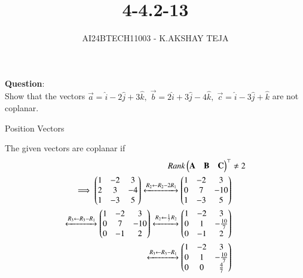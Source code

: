 \documentclass[journal]{IEEEtran}
\begin{document}

\vspace{3cm}

\title{4-4.2-13}
\author{AI24BTECH11003 - K.AKSHAY TEJA}
{\let\newpage\relax\maketitle}

\renewcommand{\thefigure}{\theenumi}
\renewcommand{\thetable}{\theenumi}
\setlength{\intextsep}{10pt} %


\renewcommand{\thetable}{\theenumi}


\textbf{Question}:\\
Show that the vectors \(\vec{a} = \hat{i} - 2 \hat{j} + 3 \hat{k}, \; 
\vec{b} = 2 \hat{i} + 3 \hat{j} - 4 \hat{k}, \;\vec{c} = \hat{i} - 3 \hat{j} + \hat{k}\) are not coplanar.\\

\solution
\begin{table}[h!]
	\centering
	
	\caption{Position Vectors}
	\label{tab:4-4.4-32}
\end{table}
The given vectors are coplanar if 
\begin{align}
	Rank\begin{pmatrix}\mathbf{A} & \mathbf{B} & \mathbf{C}\end{pmatrix}^\top &\neq 2\\
	\implies \begin{pmatrix}1 &-2 & 3\\ 2 &3 &-4\\1 &-3 &5\end{pmatrix} \xleftrightarrow[]{R_2 \leftarrow R_2 - 2R_1} \begin{pmatrix}1 &-2& 3\\0& 7& -10\\1 &-3 &5\end{pmatrix}\\
 \xleftrightarrow[]{R_3 \leftarrow R_3 - R_1 } \begin{pmatrix}1 &-2& 3\\0& 7 &-10\\0& -1 &2\end{pmatrix}
	\xleftrightarrow[]{R_2 \leftarrow \frac{1}{7}R_2} \begin{pmatrix}1 &-2& 3\\0& 1& -\frac{10}{7}\\0 &-1& 2\end{pmatrix}\\\xleftrightarrow[]{R_3 \leftarrow R_3-R_1}\begin{pmatrix}1&-2& 3 \\0& 1 &-\frac{10}{7}\\0& 0& \frac{4}{7} \end{pmatrix}
\end{align}
\end{document}
